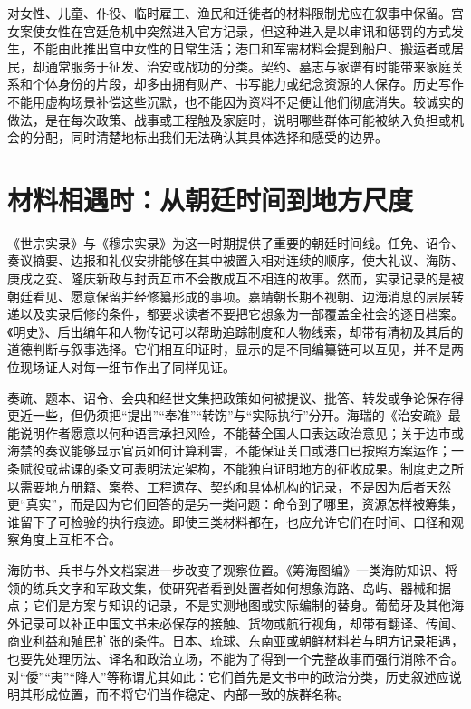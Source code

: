 对女性、儿童、仆役、临时雇工、渔民和迁徙者的材料限制尤应在叙事中保留。宫女案使女性在宫廷危机中突然进入官方记录，但这种进入是以审讯和惩罚的方式发生，不能由此推出宫中女性的日常生活；港口和军需材料会提到船户、搬运者或居民，却通常服务于征发、治安或战功的分类。契约、墓志与家谱有时能带来家庭关系和个体身份的片段，却多由拥有财产、书写能力或纪念资源的人保存。历史写作不能用虚构场景补偿这些沉默，也不能因为资料不足便让他们彻底消失。较诚实的做法，是在每次政策、战事或工程触及家庭时，说明哪些群体可能被纳入负担或机会的分配，同时清楚地标出我们无法确认其具体选择和感受的边界。

\section{材料相遇时：从朝廷时间到地方尺度}

《世宗实录》与《穆宗实录》为这一时期提供了重要的朝廷时间线。任免、诏令、奏议摘要、边报和礼仪安排能够在其中被置入相对连续的顺序，使大礼议、海防、庚戌之变、隆庆新政与封贡互市不会散成互不相连的故事。然而，实录记录的是被朝廷看见、愿意保留并经修纂形成的事项。嘉靖朝长期不视朝、边海消息的层层转递以及实录后修的条件，都要求读者不要把它想象为一部覆盖全社会的逐日档案。《明史》、后出编年和人物传记可以帮助追踪制度和人物线索，却带有清初及其后的道德判断与叙事选择。它们相互印证时，显示的是不同编纂链可以互见，并不是两位现场证人对每一细节作出了同样见证。

奏疏、题本、诏令、会典和经世文集把政策如何被提议、批答、转发或争论保存得更近一些，但仍须把“提出”“奉准”“转饬”与“实际执行”分开。海瑞的《治安疏》最能说明作者愿意以何种语言承担风险，不能替全国人口表达政治意见；关于边市或海禁的奏议能够显示官员如何计算利害，不能保证关口或港口已按照方案运作；一条赋役或盐课的条文可表明法定架构，不能独自证明地方的征收成果。制度史之所以需要地方册籍、案卷、工程遗存、契约和具体机构的记录，不是因为后者天然更“真实”，而是因为它们回答的是另一类问题：命令到了哪里，资源怎样被筹集，谁留下了可检验的执行痕迹。即使三类材料都在，也应允许它们在时间、口径和观察角度上互相不合。

海防书、兵书与外文档案进一步改变了观察位置。《筹海图编》一类海防知识、将领的练兵文字和军政文集，使研究者看到处置者如何想象海路、岛屿、器械和据点；它们是方案与知识的记录，不是实测地图或实际编制的替身。葡萄牙及其他海外记录可以补正中国文书未必保存的接触、货物或航行视角，却带有翻译、传闻、商业利益和殖民扩张的条件。日本、琉球、东南亚或朝鲜材料若与明方记录相遇，也要先处理历法、译名和政治立场，不能为了得到一个完整故事而强行消除不合。对“倭”“夷”“降人”等称谓尤其如此：它们首先是文书中的政治分类，历史叙述应说明其形成位置，而不将它们当作稳定、内部一致的族群名称。

